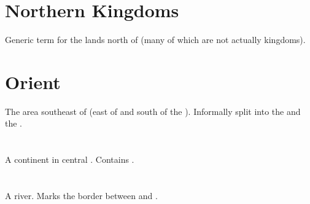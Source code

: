 \section{Northern Kingdoms}
Generic term for the lands north of  (many of which are not actually kingdoms). 
















\section{Orient}
The area southeast of  (east of  and south of the ). 
Informally split into the  and the .  
















\section{\PelidorContinent}
\index{\PelidorContinent}
A continent in central . Contains . 
















\section[Pylor]{\Pylor}
\index{\Pylor}
A river. 
Marks the border between  and .















